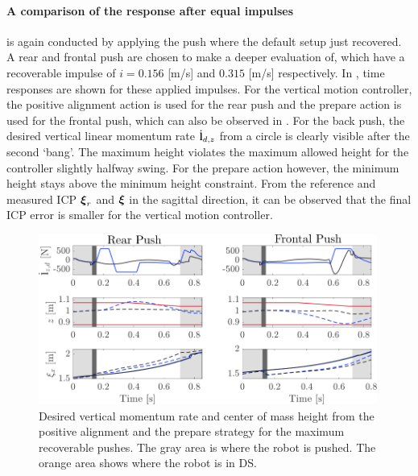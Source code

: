 \paragraph{A comparison of the response after equal impulses} is again conducted by applying the push where the default setup just recovered. A rear and frontal push are chosen to make a deeper evaluation of, which have a recoverable impulse of $i=0.156$ [m/s] and $0.315$ [m/s] respectively. In , time responses are shown for these applied impulses. For the vertical motion controller, the positive alignment action is used for the rear push and the prepare action is used for the frontal push, which can also be observed in . For the back push, the desired vertical linear momentum rate $\dot{\mathbf{l}}_{d,z}$ from a circle is clearly visible after the second `bang'. The maximum height violates the maximum allowed height for the controller slightly halfway swing. For the prepare action however, the minimum height stays above the minimum height constraint. From the reference and measured \ac{ICP} $\boldsymbol{\xi}_r$ and $\boldsymbol{\xi}$ in the sagittal direction, it can be observed that the final \ac{ICP} error is smaller for the vertical motion controller.
\begin{figure}
     \centering
        \includegraphics[width=0.99\textwidth]{STYLESTUFF/walkplot.png}
    \caption{Desired vertical momentum rate and center of mass height from the positive alignment and the prepare strategy for the maximum recoverable pushes. The gray area is where the robot is pushed. The orange area shows where the robot is in \ac{DS}.}
    \label{fig:walkplot}
\end{figure}

